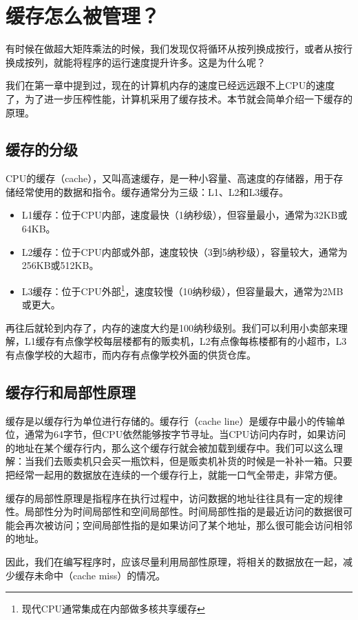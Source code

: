 \section{缓存怎么被管理？}

有时候在做超大矩阵乘法的时候，我们发现仅将循环从按列换成按行，或者从按行换成按列，就能将程序的运行速度提升许多。这是为什么呢？

我们在第一章中提到过，现在的计算机内存的速度已经远远跟不上CPU的速度了，为了进一步压榨性能，计算机采用了缓存技术。本节就会简单介绍一下缓存的原理。

\subsection{缓存的分级}

CPU的缓存（cache），又叫高速缓存，是一种小容量、高速度的存储器，用于存储经常使用的数据和指令。缓存通常分为三级：L1、L2和L3缓存。
\begin{itemize}
  \item L1缓存：位于CPU内部，速度最快（1纳秒级），但容量最小，通常为32KB或64KB。
  \item L2缓存：位于CPU内部或外部，速度较快（3到5纳秒级），容量较大，通常为256KB或512KB。
  \item L3缓存：位于CPU外部\footnote{现代CPU通常集成在内部做多核共享缓存}，速度较慢（10纳秒级），但容量最大，通常为2MB或更大。
\end{itemize}
再往后就轮到内存了，内存的速度大约是100纳秒级别。我们可以利用小卖部来理解，L1缓存有点像学校每层楼都有的贩卖机，L2有点像每栋楼都有的小超市，L3有点像学校的大超市，而内存有点像学校外面的供货仓库。

\subsection{缓存行和局部性原理}

缓存是以缓存行为单位进行存储的。缓存行（cache line）是缓存中最小的传输单位，通常为64字节，但CPU依然能够按字节寻址。当CPU访问内存时，如果访问的地址在某个缓存行内，那么这个缓存行就会被加载到缓存中。我们可以这么理解：当我们去贩卖机只会买一瓶饮料，但是贩卖机补货的时候是一补补一箱。只要把经常一起用的数据放在连续的一个缓存行上，就能一口气全带走，非常方便。

缓存的局部性原理是指程序在执行过程中，访问数据的地址往往具有一定的规律性。局部性分为时间局部性和空间局部性。时间局部性指的是最近访问的数据很可能会再次被访问；空间局部性指的是如果访问了某个地址，那么很可能会访问相邻的地址。

因此，我们在编写程序时，应该尽量利用局部性原理，将相关的数据放在一起，减少缓存未命中（cache miss）的情况。

